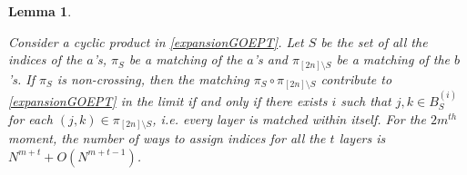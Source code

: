 \documentclass[11pt,reqno]{amsart}
\numberwithin{equation}{section}
\theoremstyle{plain}
\newtheorem{lemma}[thm]{Lemma}
\begin{document}
\begin{lemma}\label{PT-GOE lemma for bs}

Consider a cyclic product in \eqref{expansionGOEPT}. Let $S$ be the set of all the indices of the $a$'s, $\pi_S$ be a matching of the $a$'s and $\pi_{[2n]\setminus S}$ be a matching of the $b$'s. If $\pi_S$ is non-crossing, then the matching $\pi_S\circ\pi_{[2n]\setminus S}$ contribute to \eqref{expansionGOEPT} in the limit if and only if there exists $i$ such that $j, k\in B^{(i)}_S$ for each $(j, k)\in \pi_{[2n]\setminus S}$, i.e. every layer is matched within itself. For the $2m^{th}$ moment, the number of ways to assign indices for all the $t$ layers is $N^{m+t}+O(N^{m+t-1})$.
\end{lemma}
\end{document}
